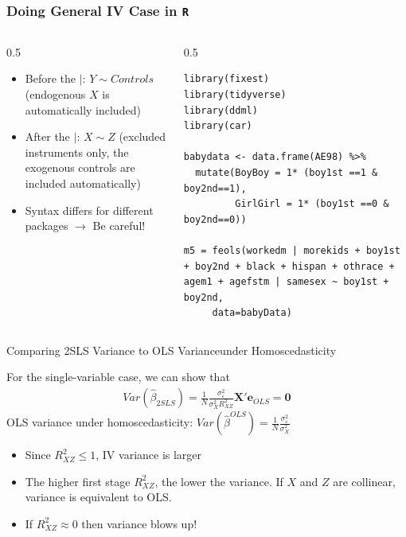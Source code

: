 \documentclass[aspectratio=169,11pt]{beamer}
\begin{document}
\begin{frame}[fragile]\frametitle{Doing General IV Case in \texttt{R}}
\begin{columns}
\begin{column}{0.5\textwidth}
\begin{itemize}
	\item Before the $\mid$: $Y \sim Controls$ (endogenous $X$ is automatically included)
	\item After the $\mid$: $X \sim Z$ (excluded instruments only, the exogenous controls are included automatically)
	\item Syntax differs for different packages $\rightarrow$ Be careful!
\end{itemize}
\end{column}
\begin{column}{0.5\textwidth}
\begin{lstlisting}
library(fixest)
library(tidyverse)
library(ddml)
library(car)

babydata <- data.frame(AE98) %>% 
  mutate(BoyBoy = 1* (boy1st ==1 & boy2nd==1),
         GirlGirl = 1* (boy1st ==0 & boy2nd==0))

m5 = feols(workedm | morekids + boy1st + boy2nd + black + hispan + othrace + agem1 + agefstm | samesex ~ boy1st + boy2nd, 
     data=babyData)
\end{lstlisting}
\end{column}
\end{columns}


\end{frame}



\begin{frame}{Comparing 2SLS Variance to OLS Variance}{under Homoscedasticity}

For the single-variable case, we can show that
\begin{align*}
	Var(\hat\beta_{2SLS}) = \frac{1}{N}\frac{\sigma_{\varepsilon}^2}{\sigma^2_X R^2_{XZ}}
\mathbf{X}'\mathbf{e}_{OLS}=\mathbf{0}
\end{align*}
	\smallskip
	OLS variance under homoscedasticity: $Var(\hat\beta^{OLS})=\frac{1}{N}\frac{\sigma_{\varepsilon}^2}{\sigma^2_X}$
		\begin{itemize}
			\item Since $R^2_{XZ}\leq 1$, IV variance is larger
			\item The higher first stage $R^2_{XZ}$, the lower the variance. If $X$ and $Z$ are collinear, variance is equivalent to OLS.
			\item If $R^2_{XZ}\approx 0$ then variance blows up!
		\end{itemize}
\end{frame}
\end{document}
